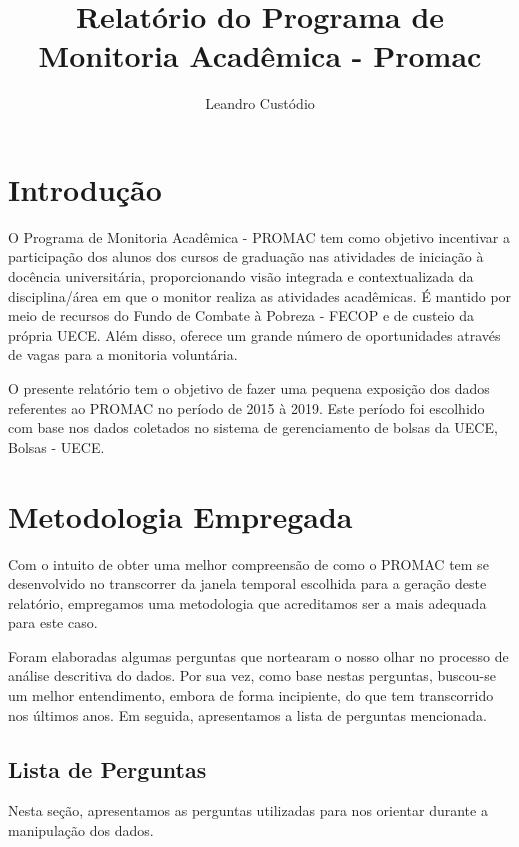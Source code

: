 \documentclass[12pt,a4paper]{article}
\author{Leandro Custódio}
\title{Relatório do Programa de Monitoria Acadêmica - Promac}
\begin{document}
	\maketitle  %
	
	\pagebreak
	
    \tableofcontents \newpage

    \listoffigures \newpage

    \listoftables \newpage

    \section{Introdução}
    
    	\onehalfspacing
    	O Programa de Monitoria Acadêmica - PROMAC tem como objetivo incentivar a participação dos alunos dos cursos de 				graduação nas atividades de iniciação à docência universitária, proporcionando visão integrada e contextualizada da 			disciplina/área em que o monitor realiza as atividades acadêmicas. É mantido por meio de recursos do Fundo de Combate 		à Pobreza - FECOP e de custeio da própria UECE. Além disso, oferece um grande número de oportunidades através de 				vagas para a monitoria voluntária.

    	O presente relatório tem o objetivo de fazer uma pequena exposição dos dados referentes ao PROMAC no período de 2015 			à 2019. Este período foi escolhido com base nos dados coletados no sistema de gerenciamento de bolsas da UECE, Bolsas 		- UECE.
    	
    \section{Metodologia Empregada}
    
    	Com o intuito de obter uma melhor compreensão de como o PROMAC tem se desenvolvido no transcorrer da janela temporal 			escolhida para a geração deste relatório, empregamos uma metodologia que acreditamos ser a mais adequada para este 				caso.

    	Foram elaboradas algumas perguntas que nortearam o nosso olhar no processo de análise descritiva do dados. Por sua 				vez, como base nestas perguntas, buscou-se um melhor entendimento, embora de forma incipiente, do que tem 						transcorrido nos últimos anos. Em seguida, apresentamos a lista de perguntas mencionada.
    	
    	\subsection{Lista de Perguntas}
        Nesta seção, apresentamos as perguntas utilizadas para nos orientar durante a manipulação dos dados.
\end{document}
